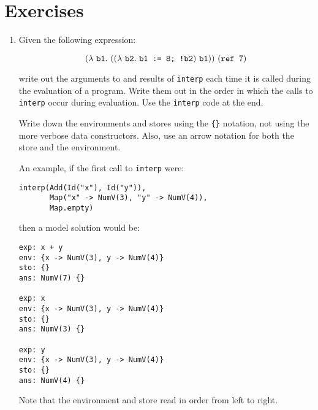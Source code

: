 \section{Exercises}

\begin{enumerate}
\item Given the following expression:

\[
    (\lambda\ \code{b1}.\ ((\lambda\ \code{b2}.\ \code{b1} \texttt{ := 8; !}\code{b2})\ \code{b1}))\ (\texttt{ref }7)
\]

write out the arguments to and results of \texttt{interp} each time it is called during
the evaluation of a program.  Write them out in the order in which the calls to \texttt{interp}
occur during evaluation.  Use the \texttt{interp} code at the end.

Write down the environments and stores using the \verb+{}+ notation,
not using the more verbose data constructors.
Also, use an arrow notation for both the store and the environment.

An example, if the first call to \texttt{interp} were:

\begin{verbatim}
interp(Add(Id("x"), Id("y")),
       Map("x" -> NumV(3), "y" -> NumV(4)),
       Map.empty)
\end{verbatim}

then a model solution would be:

\begin{verbatim}
exp: x + y
env: {x -> NumV(3), y -> NumV(4)}
sto: {}
ans: NumV(7) {}

exp: x
env: {x -> NumV(3), y -> NumV(4)}
sto: {}
ans: NumV(3) {}

exp: y
env: {x -> NumV(3), y -> NumV(4)}
sto: {}
ans: NumV(4) {}
\end{verbatim}

Note that the environment and store read in order from left to right.

\end{enumerate}
